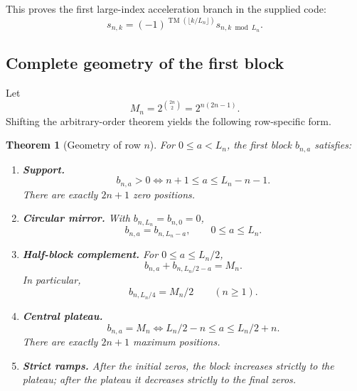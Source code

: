 \documentclass[11pt,oneside]{article}
\numberwithin{equation}{section}
\newtheorem{theorem}{Theorem}[section]
\theoremstyle{definition}
\theoremstyle{remark}
\newcommand{\TM}{\operatorname{TM}}
\begin{document}
This proves the first large-index acceleration branch in the supplied code:
\[
 s_{n,k}=(-1)^{\TM(\lfloor k/L_n\rfloor)}
 s_{n,k\bmod L_n}.
\]

\subsection{Complete geometry of the first block}

Let
\begin{equation}
 M_n=2^{\binom{2n}{2}}=2^{n(2n-1)}.
 \label{eq:Mn-definition}
\end{equation}
Shifting the arbitrary-order theorem yields the following row-specific form.

\begin{theorem}[Geometry of row \(n\)]
For \(0\le a<L_n\), the first block \(b_{n,a}\) satisfies:

\begin{enumerate}
\item \textbf{Support.}
\begin{equation}
 b_{n,a}>0
 \iff
 n+1\le a\le L_n-n-1.
 \label{eq:row-support}
\end{equation}
There are exactly \(2n+1\) zero positions.

\item \textbf{Circular mirror.}
With \(b_{n,L_n}=b_{n,0}=0\),
\begin{equation}
 \boxed{b_{n,a}=b_{n,L_n-a},\qquad 0\le a\le L_n.}
 \label{eq:row-mirror}
\end{equation}

\item \textbf{Half-block complement.}
For \(0\le a\le L_n/2\),
\begin{equation}
 \boxed{b_{n,a}+b_{n,L_n/2-a}=M_n.}
 \label{eq:row-complement}
\end{equation}
In particular,
\begin{equation}
 b_{n,L_n/4}=M_n/2
 \qquad(n\ge1).
 \label{eq:quarter-value}
\end{equation}

\item \textbf{Central plateau.}
\begin{equation}
 \boxed{
 b_{n,a}=M_n
 \iff
 L_n/2-n\le a\le L_n/2+n.}
 \label{eq:row-plateau}
\end{equation}
There are exactly \(2n+1\) maximum positions.

\item \textbf{Strict ramps.}  After the initial zeros, the block increases
strictly to the plateau; after the plateau it decreases strictly to the final
zeros.


\end{enumerate}
\end{theorem}
\end{document}
